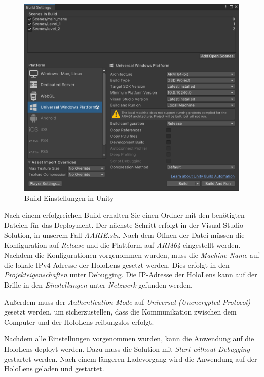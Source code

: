 \begin{figure}[H]
    \centering
    \includegraphics[scale=0.8]{images/build}
    \caption{Build-Einstellungen in Unity}
    \label{fig:build-settings}
\end{figure}

Nach einem erfolgreichen Build erhalten Sie einen Ordner mit den benötigten Dateien für das Deployment. Der nächste
Schritt erfolgt in der Visual Studio Solution, in unserem Fall \textit{AARIE.sln}. Nach dem Öffnen der Datei müssen die
Konfiguration auf \textit{Release} und die Plattform auf \textit{ARM64} eingestellt werden. Nachdem die Konfigurationen
vorgenommen wurden, muss die \textit{Machine Name} auf die lokale IPv4-Adresse der HoloLens gesetzt werden. Dies erfolgt in
den \textit{Projekteigenschaften} unter Debugging. Die IP-Adresse der HoloLens kann auf der Brille in den \textit{Einstellungen}
unter \textit{Netzwerk} gefunden werden.

Außerdem muss der \textit{Authentication Mode} auf \textit{Universal (Unencrypted Protocol)} gesetzt werden, um
sicherzustellen, dass die Kommunikation zwischen dem Computer und der HoloLens reibungslos erfolgt.

Nachdem alle Einstellungen vorgenommen wurden, kann die Anwendung auf die HoloLens deployt werden. Dazu muss die
Solution mit \textit{Start without Debugging} gestartet werden. Nach einem längeren Ladevorgang wird die Anwendung auf der
HoloLens geladen und gestartet.

